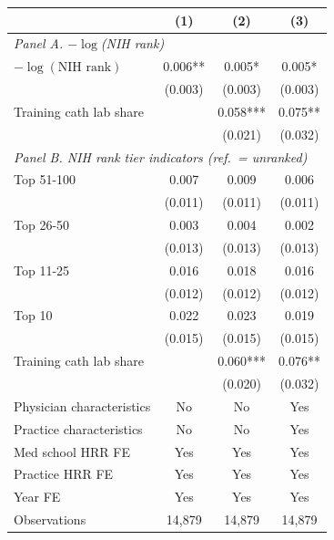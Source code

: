 \begin{tabular}{lccc}
\toprule
 & (1) & (2) & (3) \\
\midrule
\multicolumn{4}{l}{\textit{Panel A. $-\log$(NIH rank)}} \\
$-\log(\text{NIH rank})$ & 0.006** & 0.005* & 0.005* \\
 & (0.003) & (0.003) & (0.003) \\
Training cath lab share &   & 0.058*** & 0.075** \\
 &   & (0.021) & (0.032) \\
\midrule
\multicolumn{4}{l}{\textit{Panel B. NIH rank tier indicators (ref.\ = unranked)}} \\
Top 51-100 & 0.007 & 0.009 & 0.006 \\
 & (0.011) & (0.011) & (0.011) \\
Top 26-50 & 0.003 & 0.004 & 0.002 \\
 & (0.013) & (0.013) & (0.013) \\
Top 11-25 & 0.016 & 0.018 & 0.016 \\
 & (0.012) & (0.012) & (0.012) \\
Top 10 & 0.022 & 0.023 & 0.019 \\
 & (0.015) & (0.015) & (0.015) \\
Training cath lab share &   & 0.060*** & 0.076** \\
 &   & (0.020) & (0.032) \\
\midrule
Physician characteristics & No & No & Yes \\
Practice characteristics & No & No & Yes \\
Med school HRR FE & Yes & Yes & Yes \\
Practice HRR FE & Yes & Yes & Yes \\
Year FE & Yes & Yes & Yes \\
Observations & 14,879 & 14,879 & 14,879 \\
\bottomrule
\end{tabular}

